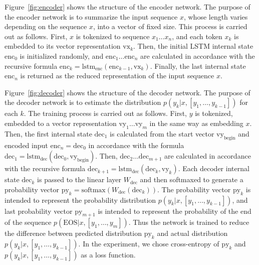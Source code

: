 \documentclass[senior,final,11pt]{iscs-thesis}
\begin{document}
Figure~\ref{fig:encoder} shows the structure of the encoder network.  The purpose of the encoder network is to summarize the input sequence $x$, whose length varies depending on the sequence $x$, into a vector of fixed size.
This process is carried out as follows. 
First, $x$ is tokenized to sequence $x_{1} \dots x_{n}$, and each token $x_{k}$ is embedded to its vector representation $\mathrm{vx}_{k}$. 
Then, the initial LSTM internal state $\mathrm{enc}_0$ is initialized randomly, 
and $ \mathrm{enc}_{1} \dots \mathrm{enc}_{n} $ are calculated in accordance with the recursive formula $ \mathrm{enc}_{k} = \mathrm{lstm}_{\mathrm{enc}}(\mathrm{enc}_{k-1},\mathrm{vx}_{k}) $.
Finally, the last internal state $ \mathrm{enc}_{n}$ is returned as the reduced representation of the input sequence $x$.

Figure~\ref{fig:decoder} shows the structure of the decoder network.  The purpose of the decoder network is to estimate the distribution $ p(y_k|x,[y_1,\dots,y_{k-1}]) $ for each $ k $. 
The training process is carried out as follows. 
First, $y$ is tokenized, embedded to a vector representation $\mathrm{vy}_{1} \dots \mathrm{vy}_{m}$ in the same way as embedding $x$.
Then, the first internal state $ \mathrm{dec}_{1}$ is calculated from the start vector $\mathrm{vy}_{\mathrm{begin}}$ and encoded input $ \mathrm{enc}_{n} = \mathrm{dec}_{0} $ in accordance with the formula  $ \mathrm{dec}_1 = \mathrm{lstm}_{\mathrm{dec}}(\mathrm{dec}_{0},\mathrm{vy}_{\mathrm{begin}}) $.
Then, $ \mathrm{dec}_{2} \dots \mathrm{dec}_{m+1} $ are calculated in accordance with the recursive formula $ \mathrm{dec}_{k+1} = \mathrm{lstm}_{\mathrm{dec}}(\mathrm{dec}_{k},\mathrm{vy}_{k}) $.
Each decoder internal state $ \mathrm{dec}_{k} $ is passed to the linear layer $ W_{\mathrm{dec}} $ and then softmaxed to generate a probability vector $ \mathrm{py}_{k} = \mathrm{softmax}(W_{\mathrm{dec}}(\mathrm{dec}_{k}))$.
The probability vector $ \mathrm{py}_{k} $ is intended to represent the probability distribution $ p(y_k|x,[y_1,\dots,y_{k-1}]) $,
and last probability vector $ \mathrm{py}_{m+1} $ is intended to represent the probability of the end of the sequence $ p(\mathrm{EOS}|x,[y_1,\dots,y_{m}]) $.
Thus the network is trained to reduce the difference between predicted distribution $ \mathrm{py}_{k} $ and actual distribution $ p(y_k|x,[y_1,\dots,y_{k-1}]) $.
In the experiment, we chose cross-entropy of $ \mathrm{py}_{k} $ and $ p(y_k|x,[y_1,\dots,y_{k-1}]) $ as a loss function.
\end{document}
